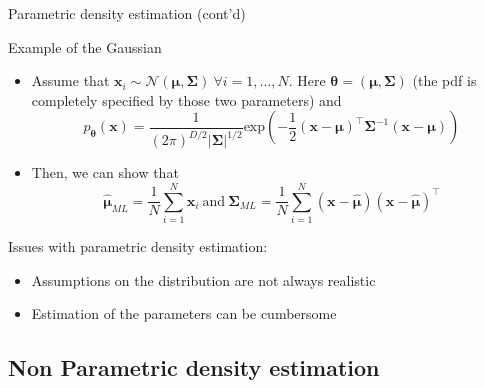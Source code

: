 \documentclass{beamer}
\begin{document}
\begin{frame}{Parametric density estimation (cont'd)}
\begin{block}{Example of the Gaussian}
\begin{itemize}
\item Assume that $\mathbf{x}_{i} \sim \mathcal{N}(\boldsymbol{\mu},\boldsymbol{\Sigma}) \ \forall i = 1,...,N$. Here $\boldsymbol{\theta}= (\boldsymbol{\mu},\boldsymbol{\Sigma}) $ (the pdf is completely specified by those two parameters) and \begin{equation*}
p_{\boldsymbol{\theta}}(\mathbf{x}) = \frac{1}{(2\pi)^{D/2} |\boldsymbol{\Sigma}|^{1/2}} \textrm{exp}\left(-\frac{1}{2} (\mathbf{x}-\boldsymbol{\mu})^{\top} \boldsymbol{\Sigma}^{-1} (\mathbf{x}-\boldsymbol{\mu}) \right)
\end{equation*}
\item Then, we can show that
\begin{equation*}
\hat{\boldsymbol{\mu}}_{ML}
 = \frac{1}{N} \sum_{i=1}^{N} \mathbf{x}_{i} \ \textrm{and} \
\hat{\boldsymbol{\Sigma}}_{ML} = \frac{1}{N} \sum_{i=1}^{N} (\mathbf{x} - \hat{\boldsymbol{\mu}})(\mathbf{x} - \hat{\boldsymbol{\mu}})^{\top}
\end{equation*}

\end{itemize}

\end{block}

Issues with parametric density estimation:\\
\begin{itemize}
\item Assumptions on the distribution are not always realistic
\item Estimation of the parameters can be cumbersome
\end{itemize}

\end{frame}

\subsection{Non Parametric density estimation}
\end{document}

